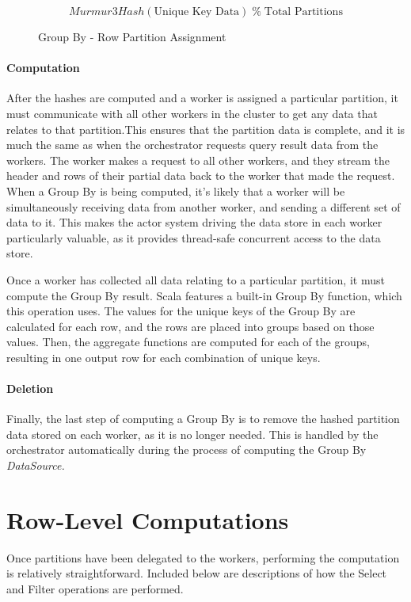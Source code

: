 \begin{figure}[h]
	\centering
	\[ Murmur3Hash(\text{Unique Key Data}) \; \%  \; \text{Total Partitions} \]
	\caption{Group By - Row Partition Assignment}
	\label{fig:group-by-partition-assign}
\end{figure} 

\paragraph{Computation}
After the hashes are computed and a worker is assigned a particular partition, it must communicate with all other workers in the cluster to get any data that relates to that partition.This ensures that the partition data is complete, and it is much the same as when the orchestrator requests query result data from the workers. The worker makes a request to all other workers, and they stream the header and rows of their partial data back to the worker that made the request. When a Group By is being computed, it's likely that a worker will be simultaneously receiving data from another worker, and sending a different set of data to it. This makes the actor system driving the data store in each worker particularly valuable, as it provides thread-safe concurrent access to the data store.

Once a worker has collected all data relating to a particular partition, it must compute the Group By result. Scala features a built-in Group By function, which this operation uses. The values for the unique keys of the Group By are calculated for each row, and the rows are placed into groups based on those values. Then, the aggregate functions are computed for each of the groups, resulting in one output row for each combination of unique keys. 

\paragraph{Deletion}
Finally, the last step of computing a Group By is to remove the hashed partition data stored on each worker, as it is no longer needed. This is handled by the orchestrator automatically during the process of computing the Group By \textit{DataSource.}

\section{Row-Level Computations}
Once partitions have been delegated to the workers, performing the computation is relatively straightforward. Included below are descriptions of how the Select and Filter operations are performed.

